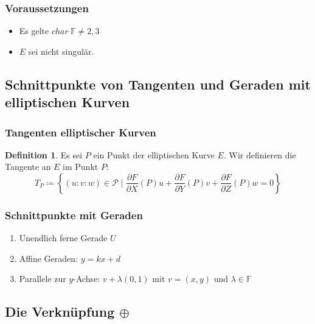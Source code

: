 \documentclass{beamer}
\theoremstyle{plain}
\theoremstyle{definition}
\newtheorem{defn}[thm]{Definition}
\theoremstyle{rem}
\begin{document}
\begin{frame}
\frametitle{Voraussetzungen}
\begin{itemize}
    \item Es gelte $char\ \mathbb{F}\ne2,3$
    \item $E$ sei nicht singulär.
\end{itemize}
\end{frame}

\subsection{Schnittpunkte von Tangenten und Geraden  mit elliptischen Kurven}

\begin{frame}
    \frametitle{Tangenten elliptischer Kurven}
    \begin{defn}
        Es sei $P$ ein Punkt der elliptischen Kurve $E$. Wir definieren die Tangente an $E$ im Punkt $P$:
        \begin{equation*}
            T_P\coloneqq\left\{(u:v:w)\in\mathcal{P}\mid\frac{\partial F}{\partial X}(P)u+\frac{\partial F}{\partial Y}(P)v+\frac{\partial F}{\partial Z}(P)w=0\right\}
        \end{equation*}
    \end{defn}
\end{frame}

\begin{frame}
    \frametitle{Schnittpunkte mit Geraden}
    \begin{enumerate}[<+->]
        \item Unendlich ferne Gerade $U$
        \item Affine Geraden: $y = kx +d$
        \item Parallele zur $y$-Achse: $v + \lambda (0,1)$ mit $v=(x,y)$ und $\lambda \in \mathbb{F}$
    \end{enumerate}
\end{frame}

\subsection{Die Verknüpfung $\oplus$}
\end{document}
